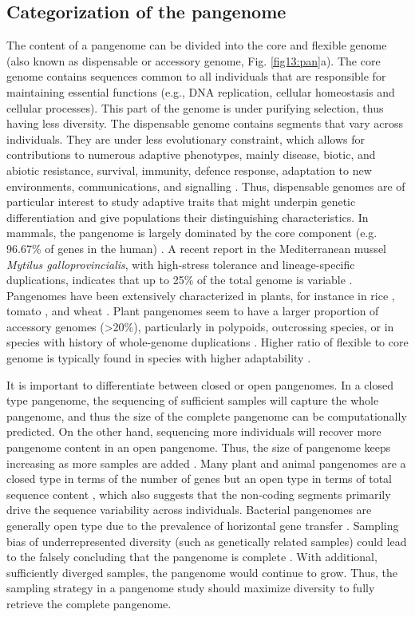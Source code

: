 \documentclass[../main.tex]{subfiles}
\begin{document}
\subsection*{Categorization of the pangenome}

The content of a pangenome can be divided into the core and flexible genome (also known  as dispensable or accessory genome, Fig. \ref{fig13:pan}a). The core genome contains sequences common to all individuals that are responsible for maintaining essential functions (e.g., DNA replication, cellular homeostasis and cellular processes). This part of the genome is under purifying selection, thus having less diversity. The dispensable genome contains segments that vary across individuals. They are under less evolutionary constraint, which allows for contributions to numerous adaptive phenotypes, mainly disease, biotic, and abiotic resistance, survival, immunity, defence response, adaptation to new environments, communications, and signalling \citep{golicz2020pangenomics}. Thus, dispensable genomes are of particular interest to study adaptive traits that might underpin genetic differentiation and give populations their distinguishing characteristics. In mammals, the pangenome is largely dominated by the core component (e.g. 96.67\% of genes in the human) \citep{duan2019hupan}. A recent report in the Mediterranean mussel \emph{Mytilus galloprovincialis}, with high-stress tolerance and lineage-specific duplications, indicates that up to 25\% of the total genome is variable \citep{gerdol2020massive}. Pangenomes have been extensively characterized in plants, for instance in rice \citep{zhao2018pan}, tomato \citep{gao2019tomato}, and wheat \citep{walkowiak2020multiple}. Plant pangenomes seem to have a larger proportion of accessory genomes (>20\%), particularly in polypoids, outcrossing species, or in species with history of whole-genome duplications \citep{tao2019exploring}. Higher ratio of flexible to core genome is typically found in species with higher adaptability \citep{tranchant2018plant}. 

It is important to differentiate between closed or open pangenomes. In a closed type pangenome, the sequencing of sufficient samples will capture the whole pangenome, and thus the size of the complete pangenome can be computationally predicted. On the other hand, sequencing more individuals will recover more pangenome content in an open pangenome. Thus, the size of pangenome keeps increasing as more samples are added \citep{golicz2020pangenomics}. Many plant and animal pangenomes are a closed type in terms of the number of genes but an open type in terms of total sequence content \citep{duan2019hupan,golicz2020pangenomics}, which also suggests that the non-coding segments primarily drive the sequence variability across individuals. Bacterial pangenomes  are generally open type due to the prevalence of horizontal gene transfer \citep{soucy2015horizontal}. Sampling bias of underrepresented diversity (such as genetically related samples) could lead to the falsely concluding that the pangenome is complete \citep{tranchant2018plant}. With additional, sufficiently  diverged samples, the  pangenome would continue to grow. Thus, the sampling strategy in a pangenome study should maximize diversity to fully retrieve the complete pangenome. 
\end{document}
